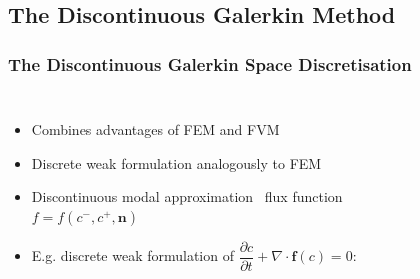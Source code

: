 	\subsection{The Discontinuous Galerkin Method}
	\begin{frame}
		\frametitle{The Discontinuous Galerkin Space Discretisation}
		\begin{columns}[t]
			\column[]{8.2cm}
			\vspace{-0.5cm}
			\begin{itemize}
				\item Combines advantages of FEM and FVM
				\item Discrete weak formulation analogously to FEM
				\item Discontinuous modal approximation \newline \MVRightArrow \, flux function $f = f(c^-, c^+, \mathbf{n})$
				\pause
				\item E.g. discrete weak formulation of $\dfrac{\partial c}{\partial t} + \nabla \cdot \boldsymbol{f}(c) = 0 $:
			\end{itemize}
			\vspace{-0.3cm}
	\onslide
			\column[]{3.8cm}
			\begin{figure}[ht]
				\vspace{-1cm}

\end{figure}
\end{columns}
\end{frame}
